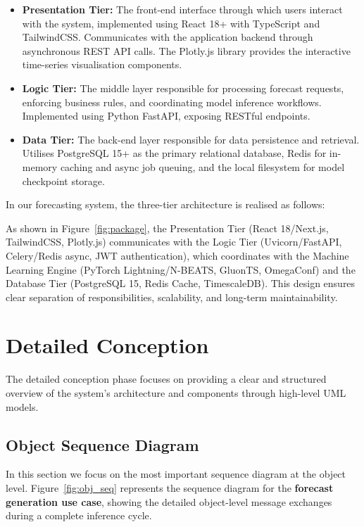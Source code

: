 \begin{itemize}
  \item \textbf{Presentation Tier:} The front-end interface through which
        users interact with the system, implemented using React 18+ with
        TypeScript and TailwindCSS. Communicates with the application
        backend through asynchronous REST API calls. The Plotly.js library
        provides the interactive time-series visualisation components.

  \item \textbf{Logic Tier:} The middle layer responsible for processing
        forecast requests, enforcing business rules, and coordinating
        model inference workflows. Implemented using Python FastAPI,
        exposing RESTful endpoints. 

  \item \textbf{Data Tier:} The back-end layer responsible for data
        persistence and retrieval. Utilises PostgreSQL 15+ as the primary
        relational database, Redis for in-memory caching and async job
        queuing, and the local filesystem for model checkpoint storage.
\end{itemize}

In our forecasting system, the three-tier architecture is realised as follows:

As shown in Figure~\ref{fig:package}, the Presentation Tier (React 18/Next.js,
TailwindCSS, Plotly.js) communicates with the Logic Tier (Uvicorn/FastAPI,
Celery/Redis async, JWT authentication), which coordinates with the
Machine Learning Engine (PyTorch Lightning/N-BEATS, GluonTS, OmegaConf)
and the Database Tier (PostgreSQL 15, Redis Cache, TimescaleDB). This
design ensures clear separation of responsibilities, scalability, and
long-term maintainability.

\section{Detailed Conception}
\label{sec:detailed}

The detailed conception phase focuses on providing a clear and structured
overview of the system's architecture and components through high-level
UML models.

\subsection{Object Sequence Diagram}
\label{subsec:object_seq}

In this section we focus on the most important sequence diagram at the
object level. Figure~\ref{fig:obj_seq} represents the sequence diagram
for the \textbf{forecast generation use case}, showing the detailed
object-level message exchanges during a complete inference cycle.


